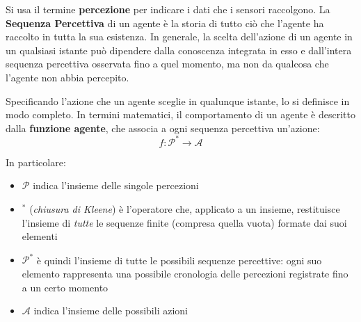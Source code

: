 \documentclass[a4paper, 11pt, oneside]{book}
\theoremstyle{definition}
\begin{document}
	\vspace{1em}
	Si usa il termine \textbf{percezione} per indicare i dati che i sensori raccolgono.
	La \textbf{Sequenza Percettiva} di un agente \`e la storia di tutto ci\`o che
	l'agente ha raccolto in tutta la sua esistenza. In generale, la scelta dell'azione
	di un agente in un qualsiasi istante pu\`o dipendere dalla conoscenza
	integrata in esso e dall'intera sequenza percettiva osservata fino a quel
	momento, ma non da qualcosa che l'agente non abbia percepito.

	Specificando l'azione che un agente sceglie in qualunque istante, lo si definisce in
	modo completo. In termini matematici, il comportamento di un agente \`e descritto dalla
	\textbf{funzione agente}, che associa a ogni sequenza percettiva un'azione:
	\begin{displaymath}
		f: \mathcal{P}^{*}\rightarrow \mathcal{A}
	\end{displaymath}

	In particolare:
	\begin{itemize}
		\item $\mathcal{P}$ indica l'insieme delle singole percezioni

		\item $^{*}$ (\emph{chiusura di Kleene}) \`e l'operatore che, applicato a un
			insieme, restituisce l'insieme di \emph{tutte} le sequenze finite (compresa
			quella vuota) formate dai suoi elementi

		\item $\mathcal{P}^{*}$ \`e quindi l'insieme di tutte le possibili sequenze
			percettive: ogni suo elemento rappresenta una possibile cronologia delle percezioni
			registrate fino a un certo momento

		\item $\mathcal{A}$ indica l'insieme delle possibili azioni
	\end{itemize}
\end{document}
